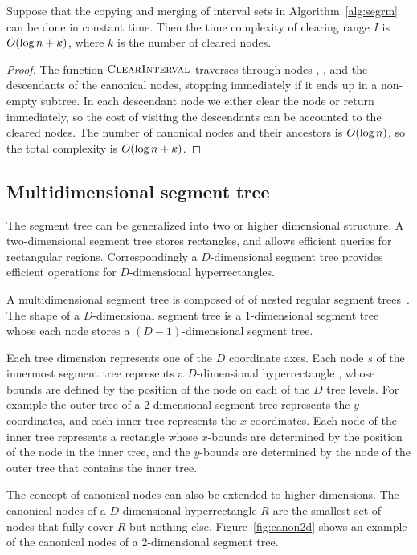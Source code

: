 \documentclass[english,gradu]{tktltiki2018}
\begin{document}
\begin{lem}\label{lem:segrmtime}Suppose that the copying and merging of interval sets in Algorithm~\ref{alg:segrm} can be done in constant time.
Then the time complexity of clearing range $I$ is $O(\log n + k)$, where $k$ is the number of cleared nodes.\end{lem}
\begin{proof}
The function $\textsc{ClearInterval}$ traverses through nodes , , and the descendants of the canonical nodes, stopping immediately if it ends up in a non-empty subtree.
In each descendant node we either clear the node or return immediately, so the cost of visiting the descendants can be accounted to the cleared nodes.
The number of canonical nodes and their ancestors is $O(\log n)$, so the total complexity is $O(\log n + k)$.
\end{proof}


\subsection{Multidimensional segment tree}

The segment tree can be generalized into two or higher dimensional structure.
A two-dimensional segment tree stores rectangles, and allows efficient queries for rectangular regions.
Correspondingly a $D$-dimensional segment tree provides efficient operations for $D$-dimensional hyperrectangles.

A multidimensional segment tree is composed of of nested regular segment trees~\cite{highseg}.
The shape of a $D$-dimensional segment tree is a 1-dimensional segment tree whose each node stores a $(D-1)$-dimensional segment tree.

Each tree dimension represents one of the $D$ coordinate axes.
Each node $s$ of the innermost segment tree represents a $D$-dimensional hyperrectangle , whose bounds are defined by the position of the node on each of the $D$ tree levels.
For example the outer tree of a 2-dimensional segment tree represents the $y$ coordinates, and each inner tree represents the $x$ coordinates.
Each node of the inner tree represents a rectangle whose $x$-bounds are determined by the position of the node in the inner tree, and the $y$-bounds are determined by the node of the outer tree that contains the inner tree.

The concept of canonical nodes can also be extended to higher dimensions.
The canonical nodes  of a $D$-dimensional hyperrectangle $R$ are the smallest set of nodes that fully cover $R$ but nothing else.
Figure~\ref{fig:canon2d} shows an example of the canonical nodes of a 2-dimensional segment tree.
\end{document}
